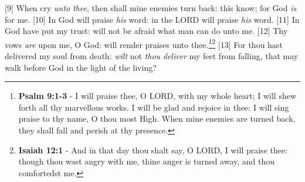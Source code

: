 [9] \textcolor[cmyk]{0.99998,1,0,0}{When  cry \emph{unto} \emph{thee}, then shall mine enemies turn back: this  know; for God \emph{is} for me.}
[10] \textcolor[cmyk]{0.99998,1,0,0}{In God will  praise \emph{his} word: in the LORD will  praise \emph{his} word.}
[11] \textcolor[cmyk]{0.99998,1,0,0}{In God have  put my trust:  will not be afraid what man can do unto me.}
[12] \textcolor[cmyk]{0.99998,1,0,0}{Thy vows \emph{are} upon me, O God:  will render praises unto thee.}\footnote{\textbf{Psalm 9:1-3} - I will praise thee, O LORD, with my whole heart; I will shew forth all thy marvellous works. I will be glad and rejoice in thee: I will sing praise to thy name, O thou most High. When mine enemies are turned back, they shall fall and perish at thy presence.}\footnote{\textbf{Isaiah 12:1} - And in that day thou shalt say, O LORD, I will praise thee: though thou wast angry with me, thine anger is turned away, and thou comfortedst me.}
[13] \textcolor[cmyk]{0.99998,1,0,0}{For thou hast delivered my soul from death: \emph{wilt} not \emph{thou} \emph{deliver} my feet from falling, that  may walk before God in the light of the living?}



